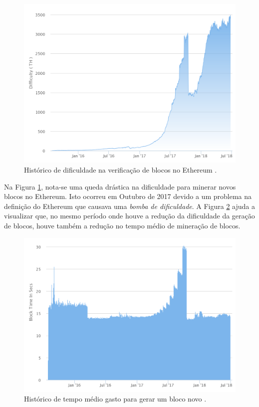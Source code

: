 \documentclass[tcc,capa]{texufpel}
\begin{document}
    \begin{figure}[h!]
        \centering
        \includegraphics[width=15cm]{imagens/chart.png}
        \caption{Histórico de dificuldade na verificação de blocos no Ethereum \cite{team2017etherscan}.}
        \label{fig:historico-dificuldade-ethereum}
    \end{figure}
    
    Na Figura \ref{fig:historico-dificuldade-ethereum}, nota-se uma queda drástica na dificuldade para minerar novos blocos no Ethereum. Isto ocorreu em Outubro de 2017 devido a um problema na definição do Ethereum que causava uma \textit{bomba de dificuldade}. A Figura \ref{fig:historico-blocktime-ethereum} ajuda a visualizar que, no mesmo período onde houve a redução da dificuldade da geração de blocos, houve também a redução no tempo médio de mineração de blocos.
    
    \begin{figure}[h!]
        \centering
        \includegraphics[width=15cm]{imagens/blocktime.png}
        \caption{Histórico de tempo médio gasto para gerar um bloco novo \cite{team2017etherscan}.}
        \label{fig:historico-blocktime-ethereum}
    \end{figure}
    
\end{document}
